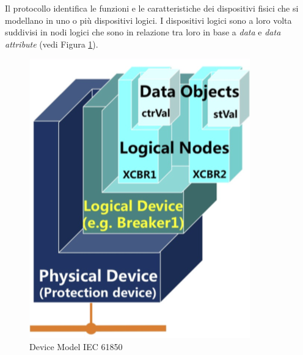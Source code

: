 
Il protocollo identifica le funzioni e le caratteristiche dei dispositivi fisici che si modellano in uno o più dispositivi logici. I dispositivi logici sono a loro volta suddivisi in nodi logici che sono in relazione tra loro in base a \emph{data} e \emph{data attribute} (vedi Figura \ref{fig:iec61850ln}).
\begin{figure}[h]
	\centering
	\includegraphics[scale=0.350]{imgs/iec61850ln.png}
	\caption{Device Model IEC 61850} \label{fig:iec61850ln}
\end{figure}

